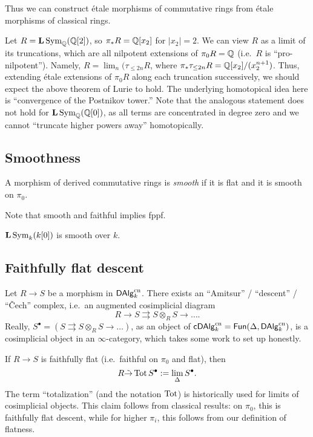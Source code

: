 \documentclass{amsart}
\begin{document}
Thus we can construct \'etale morphisms of commutative rings from \'etale morphisms of classical rings.

\begin{ex}
	Let $R = \mathbf{L} \operatorname{Sym}_{\mathbb{Q}} (\mathbb{Q}[2])$, so $\pi_* R = \mathbb{Q}[x_2]$ for $|x_2| = 2$.
	We can view $R$ as a limit of its truncations, which are all nilpotent extensions of $\pi_0 R = \mathbb{Q}$ (i.e.\ $R$ is ``pro-nilpotent'').
	Namely, $R = \lim_n (\tau_{\leq 2n} R$, where $\pi_* \tau_{\leq 2n} R = \mathbb{Q}[x_2] / (x_2^{n+1})$.
	Thus, extending \'etale extensions of $\pi_0 R$ along each truncation successively, we should expect the above theorem of Lurie to hold.
	The underlying homotopical idea here is ``convergence of the Postnikov tower.''
	Note that the analogous statement does not hold for $\mathbf{L} \operatorname{Sym}_{\mathbb{Q}}(\mathbb{Q}[0])$, as all terms are concentrated in degree zero and we cannot ``truncate higher powers away'' homotopically.
\end{ex}

\subsection{Smoothness}

\begin{dfn}
	A morphism of derived commutative rings is \emph{smooth} if it is flat and it is smooth on $\pi_0$.
\end{dfn}

Note that smooth and faithful implies fppf.

\begin{ex}
	$\mathbf{L} \operatorname{Sym}_k (k[0])$ is smooth over $k$.
\end{ex}

\subsection{Faithfully flat descent}

\begin{cons}
	Let $R \to S$ be a morphism in $\mathsf{DAlg}_k^{\mathrm{cn}}$.
	There exists an ``Amitsur'' / ``descent'' / ``\v{C}ech'' complex, i.e.\ an augmented cosimplicial diagram
	\[
		R \to S \rightrightarrows S \otimes_R S \rightarrow \dots.
	\]
	Really, $S^\bullet = \left(S \rightrightarrows S \otimes_R S \rightarrow \dots\right)$, as an object of $\mathsf{c}\mathsf{DAlg}_k^{\mathrm{cn}} = \mathsf{Fun}(\Delta, \mathsf{DAlg}_k^{\mathrm{cn}})$, is a cosimplicial object in an $\infty$-category, which takes some work to set up honestly.
\end{cons}
	
\begin{rmk}
	If $R \to S$ is faithfully flat (i.e.\ faithful on $\pi_0$ and flat), then
	\[
		R \tilde{\to} \operatorname{Tot} S^\bullet := \lim_\Delta S^\bullet.
	\]
	The term ``totalization'' (and the notation $\operatorname{Tot}$) is historically used for limits of cosimplicial objects.
	This claim follows from classical results: on $\pi_0$, this is faithfully flat descent, while for higher $\pi_i$, this follows from our definition of flatness.
\end{rmk}
\end{document}
